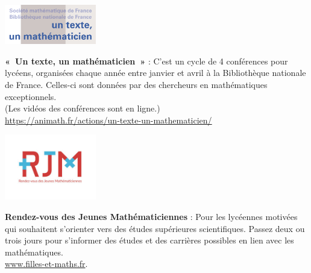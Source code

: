 \begin{minipage}[c]{.46\linewidth}
\includegraphics[width=40mm]{01-Intro/logos/utum.png}
\end{minipage}
\begin{minipage}[c]{.46\linewidth}
\textbf{«~Un texte, un mathématicien~»} :
C'est un cycle de 4 conférences pour lycéens, organisées chaque année entre janvier et avril à la Bibliothèque nationale de France. Celles-ci sont données par des chercheurs en mathématiques exceptionnels. \\
(Les vidéos des conférences sont en ligne.) \\
\url{https://animath.fr/actions/un-texte-un-mathematicien/}
\end{minipage} \hfill

\vfill
\vspace{4mm}

\pagebreak
\begin{minipage}[c]{.46\linewidth}
\includegraphics[width=40mm]{01-Intro/logos/rjm.jpg}
\end{minipage}
\begin{minipage}[c]{.46\linewidth}
\textbf{Rendez-vous des Jeunes Mathématiciennes} :
Pour les lycéennes motivées qui souhaitent s’orienter vers des études supérieures scientifiques. Passez deux ou trois jours pour s'informer des études et des carrières possibles en lien avec les mathématiques. \\
\url{www.filles-et-maths.fr}.
\end{minipage} \hfill



\vspace{4mm}



